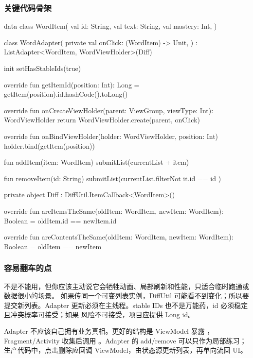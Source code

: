\subsubsection*{关键代码骨架}

\begin{kotlin}
data class WordItem(
    val id: String,
    val text: String,
    val mastery: Int,
)

class WordAdapter(
    private val onClick: (WordItem) -> Unit,
) : ListAdapter<WordItem, WordViewHolder>(Diff) {

    init {
        setHasStableIds(true)
    }

    override fun getItemId(position: Int): Long = getItem(position).id.hashCode().toLong()

    override fun onCreateViewHolder(parent: ViewGroup, viewType: Int): WordViewHolder {
        return WordViewHolder.create(parent, onClick)
    }

    override fun onBindViewHolder(holder: WordViewHolder, position: Int) {
        holder.bind(getItem(position))
    }

    fun addItem(item: WordItem) {
        submitList(currentList + item)
    }

    fun removeItem(id: String) {
        submitList(currentList.filterNot { it.id == id })
    }

    private object Diff : DiffUtil.ItemCallback<WordItem>() {
        override fun areItemsTheSame(oldItem: WordItem, newItem: WordItem): Boolean =
            oldItem.id == newItem.id

        override fun areContentsTheSame(oldItem: WordItem, newItem: WordItem): Boolean =
            oldItem == newItem
    }
}
\end{kotlin}

\subsubsection*{容易翻车的点}

 不是不能用，但你应该主动说它会牺牲动画、局部刷新和性能，只适合临时跑通或数据很小的场景。 如果传同一个可变列表实例，DiffUtil 可能看不到变化；所以要提交新列表。Adapter 更新必须在主线程。stable IDs 也不是万能药，id 必须稳定且冲突概率可接受；如果  风险不可接受，项目应提供 Long id。

\begin{followup}
Adapter 不应该自己拥有业务真相。更好的结构是 ViewModel 暴露 ，Fragment/Activity 收集后调用 。Adapter 的 add/remove 可以只作为局部练习；生产代码中，点击删除应回调 ViewModel，由状态源更新列表，再单向流回 UI。
\end{followup}

